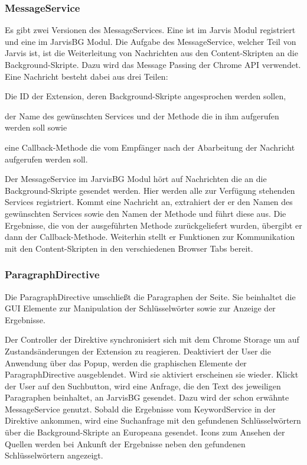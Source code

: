   \subsubsection{MessageService}
  Es gibt zwei Versionen des MessageServices. Eine ist im Jarvis Modul registriert und eine im JarvisBG Modul. Die Aufgabe des MessageService, welcher Teil von Jarvis ist, ist die Weiterleitung von Nachrichten aus den Content-Skripten an die Background-Skripte. Dazu wird das Message Passing der Chrome API verwendet. Eine Nachricht besteht dabei aus drei Teilen:
  \begin{enumerate*}
 	\item Die ID der Extension, deren Background-Skripte angesprochen werden sollen,
  	\item der Name des gewünschten Services und der Methode die in ihm aufgerufen werden soll sowie
 	\item eine Callback-Methode die vom Empfänger nach der Abarbeitung der Nachricht aufgerufen werden soll. 
  \end{enumerate*} 

  Der MessageService im JarvisBG Modul hört auf Nachrichten die an die Background-Skripte gesendet werden. Hier werden alle zur Verfügung stehenden Services registriert. Kommt eine Nachricht an, extrahiert der er den Namen des gewünschten Services sowie den Namen der Methode und führt diese aus. Die Ergebnisse, die von der ausgeführten Methode zurückgeliefert wurden, übergibt er dann der Callback-Methode. Weiterhin stellt er Funktionen zur Kommunikation mit den Content-Skripten in den verschiedenen Browser Tabs bereit.

  \subsubsection{ParagraphDirective}
  Die ParagraphDirective umschließt die Paragraphen der Seite. Sie beinhaltet die GUI Elemente zur Manipulation der Schlüsselwörter sowie zur Anzeige der Ergebnisse. 

  Der Controller der Direktive synchronisiert sich mit dem Chrome Storage um auf Zustandsänderungen der Extension zu reagieren. Deaktiviert der User die Anwendung über das Popup, werden die graphischen Elemente der ParagraphDirective ausgeblendet. Wird sie aktiviert erscheinen sie wieder. Klickt der User auf den Suchbutton, wird eine Anfrage, die den Text des jeweiligen Paragraphen beinhaltet, an JarvisBG gesendet. Dazu wird der schon erwähnte MessageService genutzt. Sobald die Ergebnisse vom KeywordService in der Direktive ankommen, wird eine Suchanfrage mit den gefundenen Schlüsselwörtern über die Background-Skripte an Europeana gesendet. Icons zum Ansehen der Quellen werden bei Ankunft der Ergebnisse neben den gefundenen Schlüsselwörtern angezeigt.

